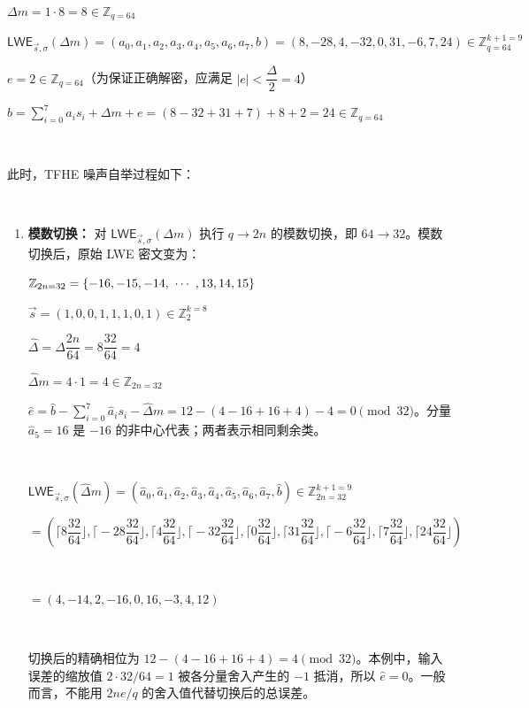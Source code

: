 $\Delta m = 1 \cdot 8 = 8 \in \mathbb{Z}_{q=64}$



$\textsf{LWE}_{\vec{s}, \sigma}(\Delta m) = (a_0, a_1, a_2, a_3, a_4, a_5, a_6, a_7, b) 
= (8, -28, 4, -32, 0, 31, -6, 7, 24) \in \mathbb{Z}_{q=64}^{k+1=9}$

$e = 2 \in \mathbb{Z}_{q=64}$（为保证正确解密，应满足 $|e| < \dfrac{\Delta}{2} = 4$）

$b = \sum\limits_{i=0}^{7}a_is_i + \Delta m + e = (8 -32 + 31 +7) + 8 + 2 = 24 \in \mathbb{Z}_{q=64}$

$ $

此时，TFHE 噪声自举过程如下：

$ $

\begin{enumerate}
\item \textbf{模数切换：} 对 $\textsf{LWE}_{\vec{s}, \sigma}(\Delta m)$ 执行 $q \rightarrow 2n$ 的模数切换，即 $64 \rightarrow 32$。模数切换后，原始 LWE 密文变为：

$\mathbb{Z}_{2n=32} = \{-16, -15, -14, \text{ } \text{$\cdots$} \text{ }, 13, 14, 15\}$

$\vec{s} = (1, 0, 0, 1, 1, 1, 0, 1) \in \mathbb{Z}_2^{k=8}$


$\hat{\Delta} = \Delta\dfrac{2n}{64} = 8\dfrac{32}{64} = 4$

$\hat{\Delta}m = 4 \cdot 1 = 4 \in \mathbb{Z}_{2n=32}$

$\hat e=\hat b-\sum_{i=0}^{7}\hat a_i s_i-\hat\Delta m=12-(4-16+16+4)-4=0\pmod{32}$。分量 $\hat a_5=16$ 是 $-16$ 的非中心代表；两者表示相同剩余类。

$ $

$\textsf{LWE}_{\vec{s}, \sigma}(\hat{\Delta}m) = (\hat{a}_0, \hat{a}_1, \hat{a}_2, \hat{a}_3, \hat{a}_4, \hat{a}_5, \hat{a}_6, \hat{a}_7, \hat{b}) \in \mathbb{Z}_{2n=32}^{k+1=9}$


$ = (\Big\lceil 8\dfrac{32}{64} \Big\rfloor, \Big\lceil -28\dfrac{32}{64}\Big\rfloor, \Big\lceil 4\dfrac{32}{64}\Big\rfloor, \Big\lceil -32\dfrac{32}{64}\Big\rfloor, \Big\lceil 0\dfrac{32}{64}\Big\rfloor, \Big\lceil 31\dfrac{32}{64}\Big\rfloor, \Big\lceil -6\dfrac{32}{64}\Big\rfloor, \Big\lceil 7\dfrac{32}{64}\Big\rfloor, \Big\lceil 24\dfrac{32}{64}\Big\rfloor)$

$ $

$= (4, {-14}, 2, -16, 0, 16, {-3}, 4, 12)$

$ $

切换后的精确相位为 $12-(4-16+16+4)=4\pmod{32}$。本例中，输入误差的缩放值 $2\cdot32/64=1$ 被各分量舍入产生的 $-1$ 抵消，所以 $\hat e=0$。一般而言，不能用 $2ne/q$ 的舍入值代替切换后的总误差。


\end{enumerate}
